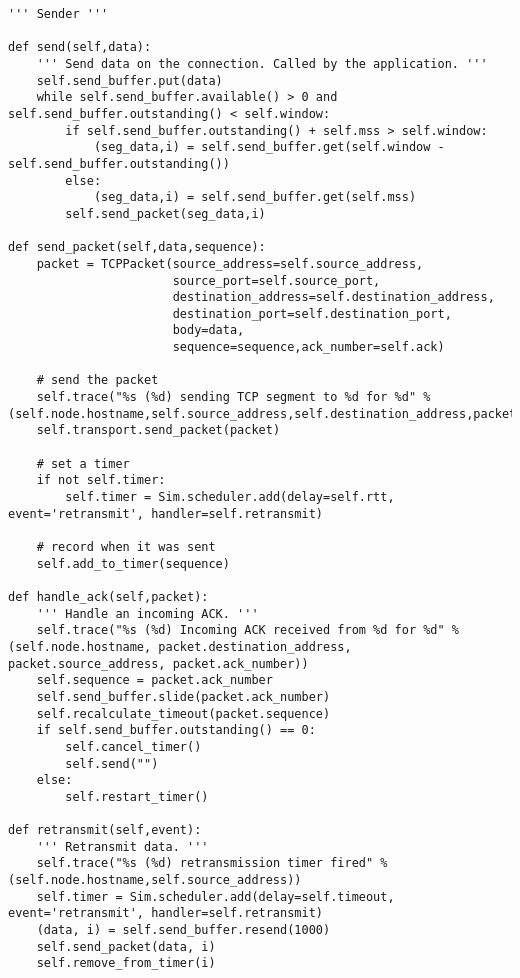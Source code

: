 \documentclass[11pt]{article}
\begin{document}
\vspace{5mm}
\begin{absolutelynopagebreak}
\begin{lstlisting}
''' Sender '''

def send(self,data):
    ''' Send data on the connection. Called by the application. '''
    self.send_buffer.put(data)
    while self.send_buffer.available() > 0 and self.send_buffer.outstanding() < self.window:
        if self.send_buffer.outstanding() + self.mss > self.window:
            (seg_data,i) = self.send_buffer.get(self.window - self.send_buffer.outstanding())
        else:
            (seg_data,i) = self.send_buffer.get(self.mss)
        self.send_packet(seg_data,i)

def send_packet(self,data,sequence):
    packet = TCPPacket(source_address=self.source_address,
                       source_port=self.source_port,
                       destination_address=self.destination_address,
                       destination_port=self.destination_port,
                       body=data,
                       sequence=sequence,ack_number=self.ack)

    # send the packet
    self.trace("%s (%d) sending TCP segment to %d for %d" % (self.node.hostname,self.source_address,self.destination_address,packet.sequence))
    self.transport.send_packet(packet)

    # set a timer
    if not self.timer:
        self.timer = Sim.scheduler.add(delay=self.rtt, event='retransmit', handler=self.retransmit)
    
    # record when it was sent
    self.add_to_timer(sequence)

def handle_ack(self,packet):
    ''' Handle an incoming ACK. '''
    self.trace("%s (%d) Incoming ACK received from %d for %d" % (self.node.hostname, packet.destination_address, packet.source_address, packet.ack_number))
    self.sequence = packet.ack_number
    self.send_buffer.slide(packet.ack_number)
    self.recalculate_timeout(packet.sequence)
    if self.send_buffer.outstanding() == 0:
        self.cancel_timer()
        self.send("")
    else:
        self.restart_timer()

def retransmit(self,event):
    ''' Retransmit data. '''
    self.trace("%s (%d) retransmission timer fired" % (self.node.hostname,self.source_address))
    self.timer = Sim.scheduler.add(delay=self.timeout, event='retransmit', handler=self.retransmit)
    (data, i) = self.send_buffer.resend(1000)
    self.send_packet(data, i)
    self.remove_from_timer(i)
\end{lstlisting}
\end{absolutelynopagebreak}
\end{document}
